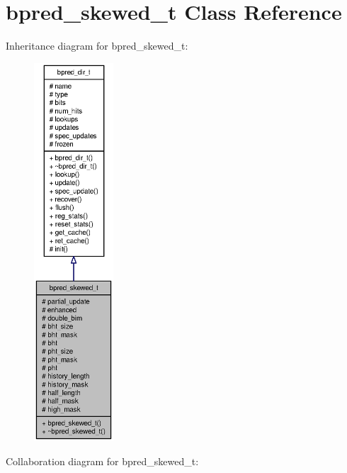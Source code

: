 \section{bpred\_\-skewed\_\-t Class Reference}
\label{classbpred__skewed__t}
Inheritance diagram for bpred\_\-skewed\_\-t:\nopagebreak
\begin{figure}[H]
\begin{center}
\leavevmode
\includegraphics[height=400pt]{classbpred__skewed__t__inherit__graph}
\end{center}
\end{figure}
Collaboration diagram for bpred\_\-skewed\_\-t:\nopagebreak
